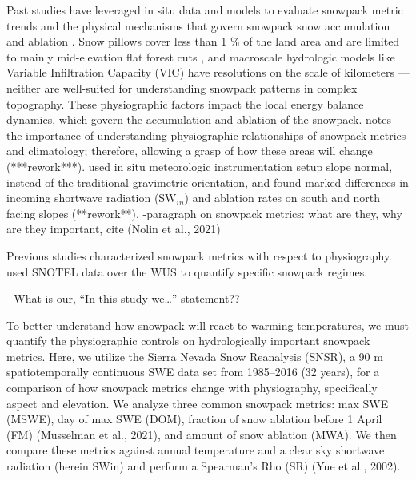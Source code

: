 Past studies have leveraged in situ data and models to evaluate snowpack metric trends \citep{clowChangesTimingSnowmelt2010,haleRecentDecreasesSnow2023,harpoldChangesSnowpackAccumulation2012a, moteDECLININGMOUNTAINSNOWPACK2005, moteDramaticDeclinesSnowpack2018, musselmanWinterMeltTrends2021} and the physical mechanisms that govern snowpack snow accumulation and ablation \citep{harpoldHumidityDeterminesSnowpack2018}. Snow pillows cover less than 1 \% of the land area and are limited to mainly mid-elevation flat forest cuts \citep{guan20102011Snow2013}, and macroscale hydrologic models like Variable Infiltration Capacity (VIC) \citep{liangSimpleHydrologicallyBased1994} have resolutions on the scale of kilometers — neither are well-suited for understanding snowpack patterns in complex topography. These physiographic factors impact the local energy balance dynamics, which govern the accumulation and ablation of the snowpack. \cite{musselmanWinterMeltTrends2021} notes the importance of understanding physiographic relationships of snowpack metrics and climatology; therefore, allowing a grasp of how these areas will change (***rework***). \cite{pomeroyVariationSurfaceEnergetics2003} used in situ meteorologic instrumentation setup slope normal, instead of the traditional gravimetric orientation, and found marked differences in incoming shortwave radiation (SW$_{in}$) and ablation rates on south and north facing slopes (**rework**).
-paragraph on snowpack metrics: what are they, why are they important, cite (Nolin et al., 2021)

Previous studies characterized snowpack metrics with respect to physiography. \cite{trujilloSnowpackRegimesWestern2014} used SNOTEL data over the WUS to quantify specific snowpack regimes. \citep{tennantRegionalSensitivitiesSeasonal2017, molotchEcohydrologicalControlsSnowmelt2009} 

 - What is our, “In this study we…” statement?? \

To better understand how snowpack will react to warming temperatures, we must quantify the physiographic controls on hydrologically important snowpack metrics. Here, we utilize the Sierra Nevada Snow Reanalysis (SNSR), a 90 m spatiotemporally continuous SWE data set from 1985–2016 (32 years), for a comparison of how snowpack metrics change with physiography, specifically aspect and elevation. We analyze three common snowpack metrics: max SWE (MSWE), day of max SWE (DOM), fraction of snow ablation before 1 April (FM) (Musselman et al., 2021), and amount of snow ablation (MWA). We then compare these metrics against annual temperature and a clear sky shortwave radiation (herein SWin) and perform a Spearman’s Rho (SR) (Yue et al., 2002).

